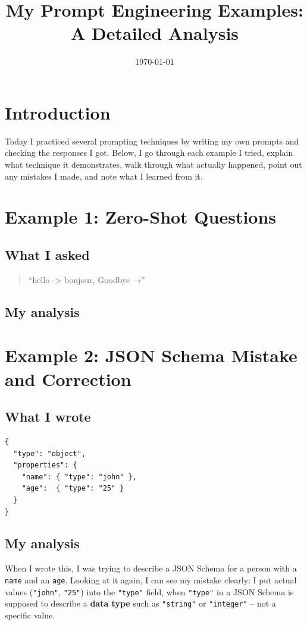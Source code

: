 \documentclass[11pt]{article}
\title{\textbf{My Prompt Engineering Examples: A Detailed Analysis}}
\author{}
\date{\today}
\begin{document}
\maketitle
\tableofcontents
\newpage

\section{Introduction}
Today I practiced several prompting techniques by writing my own prompts and checking the responses I got. Below, I go through each example I tried, explain what technique it demonstrates, walk through what actually happened, point out any mistakes I made, and note what I learned from it.

\section{Example 1: Zero-Shot Questions}

\subsection{What I asked}
\begin{quote}
``hello -> bonjour, Goodbye →''\\

\end{quote}

\subsection{My analysis}


\section{Example 2: JSON Schema Mistake and Correction}

\subsection{What I wrote}
\begin{lstlisting}
{
  "type": "object",
  "properties": {
    "name": { "type": "john" },
    "age":  { "type": "25" }
  }
}
\end{lstlisting}

\subsection{My analysis}
When I wrote this, I was trying to describe a JSON Schema for a person with a \texttt{name} and an \texttt{age}. Looking at it again, I can see my mistake clearly: I put actual values (\texttt{"john"}, \texttt{"25"}) into the \texttt{"type"} field, when \texttt{"type"} in a JSON Schema is supposed to describe a \textbf{data type} such as \texttt{"string"} or \texttt{"integer"} -- not a specific value.
\end{document}
